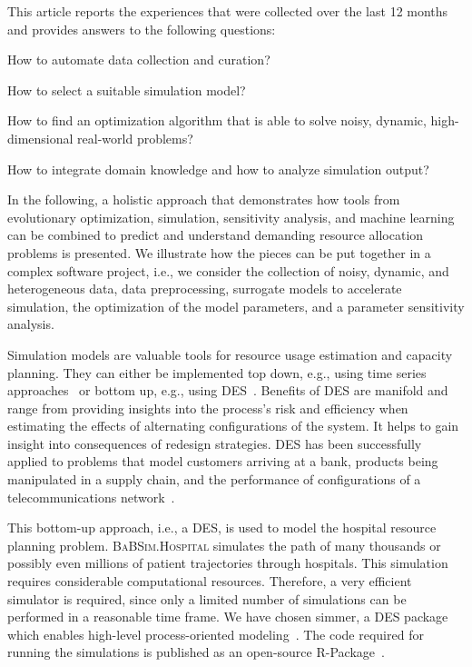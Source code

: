 \documentclass[conference]{IEEEtran}
\newcommand{\babsimhospital}{\textsc{BaBSim.Hospital}\xspace}
\begin{document}
This article reports the experiences that were collected over the last 12 months and provides answers to the following questions:
\begin{compactenum}[(Q-1)]
\item How to automate data collection and curation? 
\item How to select a suitable simulation model?
\item How to find an optimization algorithm that is able to solve noisy, dynamic, high-dimensional real-world problems?
\item How to integrate domain knowledge and how to analyze simulation output?
\end{compactenum}
In the following, a holistic approach that demonstrates how tools from evolutionary optimization, simulation, sensitivity analysis, and machine learning can be combined to predict and understand demanding resource allocation problems is presented.
We illustrate how the pieces can be put together in a complex software project, i.e., we consider the collection of noisy, dynamic, and heterogeneous data, data preprocessing, surrogate models to accelerate simulation, the optimization of the model parameters, and a parameter sensitivity analysis.

Simulation models are valuable tools for resource usage estimation and capacity planning.
They can either be implemented top down, e.g., using time series approaches~\cite{Hynd08b} or bottom up, e.g., using \gls{DES}~\cite{Bank01a}.
Benefits of \gls{DES} are manifold and range from providing insights into the process’s risk and efficiency when estimating the effects of alternating configurations of the system.
It helps to gain insight into consequences of redesign strategies.
\gls{DES} has been successfully applied to problems that model customers arriving at a bank,   
products being manipulated in a supply chain, and the performance of configurations of a telecommunications network~\cite{Bank01a}.

This bottom-up approach, i.e., a \gls{DES}, is used to model the hospital resource planning problem.
\babsimhospital simulates the path of many thousands or possibly even millions of patient trajectories through hospitals.
This simulation requires considerable computational resources.
Therefore, a very efficient simulator is required, since only a limited number of simulations can be performed in a reasonable time frame.
We have chosen \gls{simmer}, a \gls{DES} package which enables high-level process-oriented modeling~\citep{Ucar19a}. 
The code required for running the simulations is published as an open-source R-Package~\citep{Anon21b}.
\end{document}
